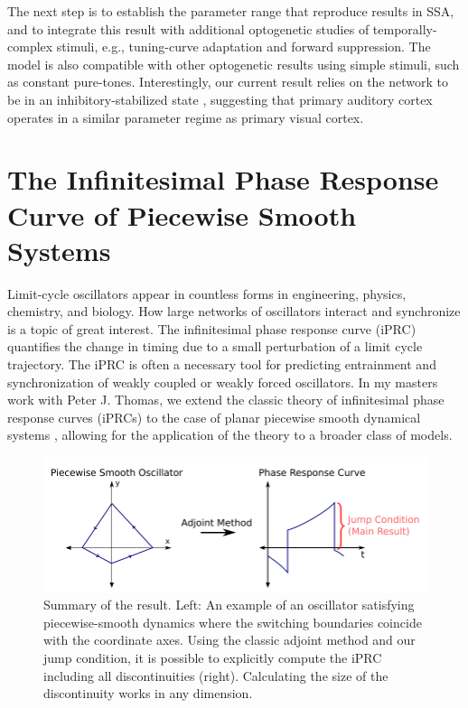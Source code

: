 \documentclass[a4paper,11pt]{article}
\begin{document}
The next step is to establish the parameter range that reproduce results in SSA, and to integrate this result with additional optogenetic studies of temporally-complex stimuli, e.g., tuning-curve adaptation and forward suppression. The model is also compatible with other optogenetic results using simple stimuli, such as constant pure-tones. Interestingly, our current result relies on the network to be in an inhibitory-stabilized state \cite{tsodyks1997paradoxical}, suggesting that primary auditory cortex operates in a similar parameter regime as primary visual cortex.




\section{The Infinitesimal Phase Response Curve of Piecewise Smooth Systems}
Limit-cycle oscillators appear in countless forms in engineering, physics, chemistry, and biology. How large networks of oscillators interact and synchronize is a topic of great interest. The infinitesimal phase response curve (iPRC) quantifies the change in timing due to a small perturbation of a limit cycle trajectory. The iPRC is often a necessary tool for predicting entrainment and synchronization of weakly coupled or weakly forced oscillators. In my masters work with Peter J. Thomas, we extend the classic theory of infinitesimal phase response curves (iPRCs) to the case of planar piecewise smooth dynamical systems \cite{park2013infinitesimal,park2018infinitesimal}, allowing for the application of the theory to a broader class of models.

\begin{figure}
\centering
 \includegraphics[width=.75\textwidth]{iprc.pdf}
 \caption{Summary of the result. Left: An example of an oscillator satisfying piecewise-smooth dynamics where the switching boundaries coincide with the coordinate axes. Using the classic adjoint method and our jump condition, it is possible to explicitly compute the iPRC including all discontinuities (right). Calculating the size of the discontinuity works in any dimension.}
\end{figure}
\end{document}
